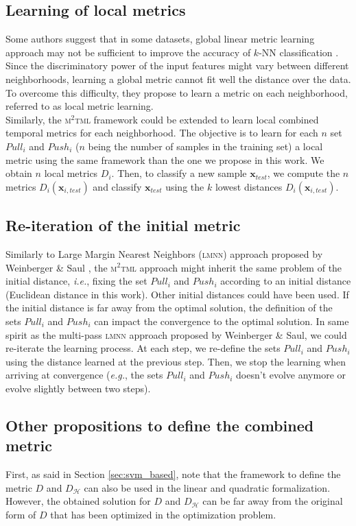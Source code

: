 \subsection*{Learning of local metrics}
Some authors suggest that in some datasets, global linear metric learning approach may not be sufficient to improve the accuracy of $k$-NN classification \cite{Weinberger2009, Wang2012}. Since the discriminatory power of the input features might vary between different neighborhoods, learning a global metric cannot fit well the distance over the data. To overcome this difficulty, they propose to learn a metric on each neighborhood, referred to as local metric learning. \\
Similarly, the \textsc{m$^2$tml} framework could be extended to learn local combined temporal metrics for each neighborhood. The objective is to learn for each $n$ set $Pull_i$ and $Push_i$ ($n$ being the number of samples in the training set) a local metric using the same framework than the one we propose in this work. We obtain $n$ local metrics $D_i$. Then, to classify a new sample $\textbf{x}_{test}$, we compute the $n$ metrics $D_i(\textbf{x}_{i,test})$ and classify $\textbf{x}_{test}$ using the $k$ lowest distances $D_i(\textbf{x}_{i,test})$.


\subsection*{Re-iteration of the initial metric}
Similarly to Large Margin Nearest Neighbors (\textsc{lmnn}) approach proposed by Weinberger \& Saul \cite{Weinberger2009}, the \textsc{m$^2$tml} approach might inherit the same problem of the initial distance, \textit{i.e.}, fixing the set $Pull_i$ and $Push_i$ according to an initial distance (Euclidean distance in this work). Other initial distances could have been used. If the initial distance is far away from the optimal solution, the definition of the sets $Pull_i$ and $Push_i$ can impact the convergence to the optimal solution. In same spirit as the multi-pass \textsc{lmnn} approach proposed by Weinberger \& Saul, we could re-iterate the learning process. At each step, we re-define the sets $Pull_i$ and $Push_i$ using the distance learned at the previous step. Then, we stop the learning when arriving at convergence (\textit{e.g.}, the sets $Pull_i$ and $Push_i$ doesn't evolve anymore or evolve slightly between two steps).

\subsection*{Other propositions to define the combined metric}
First, as said in Section \ref{sec:svm_based}, note that the framework to define the metric $D$ and $D_\mathcal{H}$ can also be used in the linear and quadratic formalization. However, the obtained solution for $D$ and $D_\mathcal{H}$ can be far away from the original form of $D$ that has been optimized in the optimization problem.

